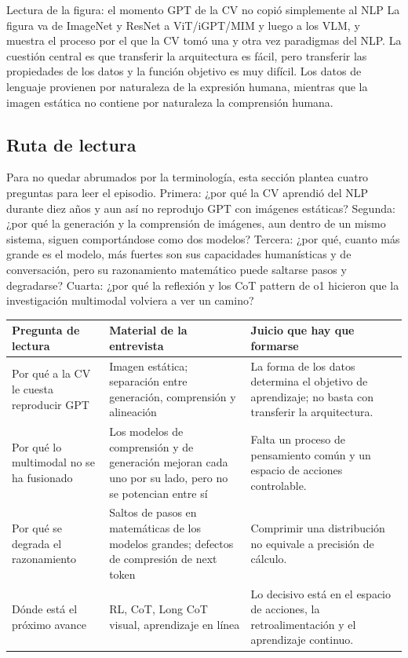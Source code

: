 \documentclass[a4paper]{article}
\begin{document}
\begin{knowledgebox}{Lectura de la figura: el momento GPT de la CV no copió simplemente al NLP}
La figura va de ImageNet y ResNet a ViT/iGPT/MIM y luego a los VLM, y muestra el proceso por el que la CV tomó una y otra vez paradigmas del NLP. La cuestión central es que transferir la arquitectura es fácil, pero transferir las propiedades de los datos y la función objetivo es muy difícil. Los datos de lenguaje provienen por naturaleza de la expresión humana, mientras que la imagen estática no contiene por naturaleza la comprensión humana.
\end{knowledgebox}

\subsection{Ruta de lectura}

Para no quedar abrumados por la terminología, esta sección plantea cuatro preguntas para leer el episodio. Primera: ¿por qué la CV aprendió del NLP durante diez años y aun así no reprodujo GPT con imágenes estáticas? Segunda: ¿por qué la generación y la comprensión de imágenes, aun dentro de un mismo sistema, siguen comportándose como dos modelos? Tercera: ¿por qué, cuanto más grande es el modelo, más fuertes son sus capacidades humanísticas y de conversación, pero su razonamiento matemático puede saltarse pasos y degradarse? Cuarta: ¿por qué la reflexión y los CoT pattern de o1 hicieron que la investigación multimodal volviera a ver un camino?

\noindent\begin{tabularx}{\textwidth}{p{}p{}X}
\toprule
Pregunta de lectura & Material de la entrevista & Juicio que hay que formarse \\
\midrule
Por qué a la CV le cuesta reproducir GPT & Imagen estática; separación entre generación, comprensión y alineación & La forma de los datos determina el objetivo de aprendizaje; no basta con transferir la arquitectura. \\
Por qué lo multimodal no se ha fusionado & Los modelos de comprensión y de generación mejoran cada uno por su lado, pero no se potencian entre sí & Falta un proceso de pensamiento común y un espacio de acciones controlable. \\
Por qué se degrada el razonamiento & Saltos de pasos en matemáticas de los modelos grandes; defectos de compresión de next token & Comprimir una distribución no equivale a precisión de cálculo. \\
Dónde está el próximo avance & RL, CoT, Long CoT visual, aprendizaje en línea & Lo decisivo está en el espacio de acciones, la retroalimentación y el aprendizaje continuo. \\
\bottomrule
\end{tabularx}
\end{document}
